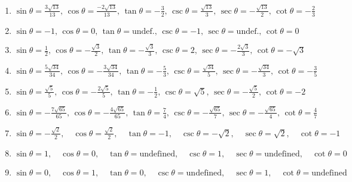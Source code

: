 \begin{enumerate}
	\item $\sin\theta = \frac{3\sqrt{13}}{13}, \, \cos\theta = \frac{-2\sqrt{13}}{13}, \, \tan\theta = -\frac{3}{2}, \, \csc\theta = \frac{\sqrt{13}}{3}, \, \sec\theta = -\frac{\sqrt{13}}{2}, \, \cot\theta = -\frac{2}{3}$

    \item $\sin\theta = -1, \, \cos\theta = 0, \, \tan\theta = \text{undef.}, \, \csc\theta = -1, \, \sec\theta = \text{undef.}, \, \cot\theta = 0$
    
    \item $\sin\theta = \frac{1}{2}, \, \cos\theta = -\frac{\sqrt{3}}{2}, \, \tan\theta = -\frac{\sqrt{3}}{3}, \, \csc\theta = 2, \, \sec\theta = -\frac{2\sqrt{3}}{3}, \, \cot\theta = -\sqrt{3}$
    
    \item $\sin \theta = \frac{5\sqrt{34}}{34}, \, \cos\theta = -\frac{3\sqrt{34}}{34}, \, \tan\theta = -\frac{5}{3}, \, \csc\theta = \frac{\sqrt{34}}{5}, \, \sec\theta = -\frac{\sqrt{34}}{3}, \, \cot\theta=-\frac{3}{5}$
    
     \item $\sin \theta = \frac{\sqrt{5}}{5}, \, \cos\theta = -\frac{2\sqrt{5}}{5}, \, \tan\theta = -\frac{1}{2}, \, \csc\theta = \sqrt{5}, \, \sec\theta = -\frac{\sqrt{5}}{2}, \, \cot\theta=-2$
    
     \item $\sin \theta = -\frac{7\sqrt{65}}{65}, \, \cos\theta = -\frac{4\sqrt{65}}{65}, \, \tan\theta = \frac{7}{4}, \, \csc\theta = -\frac{\sqrt{65}}{7}, \, \sec\theta = -\frac{\sqrt{65}}{4}, \, \cot\theta= \frac{4}{7}$
     
    
    \item $\sin\theta = -\frac{\sqrt{2}}{2}, \quad \cos\theta = \frac{\sqrt{2}}{2}, \quad \tan\theta = -1, \quad \csc\theta = -\sqrt{2}, \quad \sec\theta = \sqrt{2}, \quad \cot\theta = -1$
    
    \item $\sin\theta = 1, \quad \cos\theta = 0, \quad \tan\theta = \text{undefined}, \quad \csc\theta = 1, \quad \sec\theta = \text{undefined}, \quad \cot\theta = 0$
    
    \item $\sin\theta = 0, \quad \cos\theta = 1, \quad \tan\theta = 0, \quad \csc\theta = \text{undefined}, \quad \sec\theta = 1, \quad \cot\theta = \text{undefined}$
    
    
\end{enumerate}